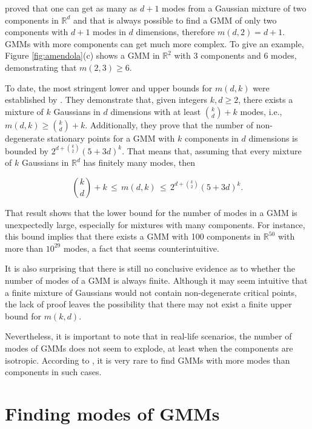 \citet{Ray2012} proved that one can get as many as $d+1$ modes from a Gaussian mixture of two components in $\mathbb{R}^d$ and that is always possible to find a GMM of only two components with $d+1$ modes in $d$ dimensions, therefore $m(d, 2) = d+1$. GMMs with more components can get much more complex. To give an example, Figure \ref{fig:amendola}(c) shows a GMM in $\mathbb{R}^2$ with 3 components and 6 modes, demonstrating that $m(2, 3) \geq 6$.

To date, the most stringent lower and upper bounds for $m(d, k)$ were established by \citet{Amendola2019}. They demonstrate that, given integers $k, d \geq 2$, there exists a mixture of $k$ Gaussians in $d$ dimensions with at least ${k \choose d} + k$ modes, i.e., $m(d, k) \geq {k \choose d} + k$. Additionally, they prove that the number of non-degenerate stationary points for a GMM with $k$ components in $d$ dimensions is bounded by $2^{d+{k \choose 2}}(5+3d)^k$. That means that, assuming that every mixture of $k$ Gaussians in $\mathbb{R}^d$ has finitely many modes, then

\begin{equation}
  {k \choose d} + k \, \leq \, m(d, k) \, \leq \, 2^{d+{k \choose 2}}\left(5+3d\right)^k.
\end{equation}

That result shows that the lower bound for the number of modes in a GMM is unexpectedly large, especially for mixtures with many components. For instance, this bound implies that there exists a GMM with 100 components in $\mathbb{R}^{50}$ with more than $10^{29}$ modes, a fact that seems counterintuitive.

It is also surprising that there is still no conclusive evidence as to whether the number of modes of a GMM is always finite. Although it may seem intuitive that a finite mixture of Gaussians would not contain non-degenerate critical points, the lack of proof leaves the possibility that there may not exist a finite upper bound for $m(k, d)$.

Nevertheless, it is important to note that in real-life scenarios, the number of modes of GMMs does not seem to explode, at least when the components are isotropic. According to \citet{Carreira-Perpinan2003a}, it is very rare to find GMMs with more modes than components in such cases.

\section{Finding modes of GMMs}
\label{sec:gmm:fmodes}

